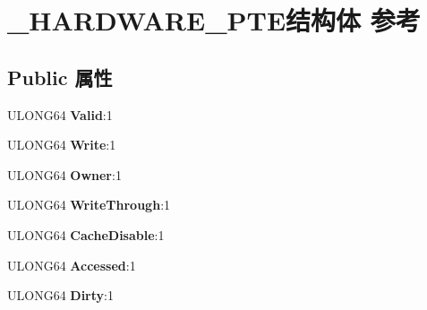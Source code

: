 \hypertarget{struct___h_a_r_d_w_a_r_e___p_t_e}{}\section{\+\_\+\+H\+A\+R\+D\+W\+A\+R\+E\+\_\+\+P\+T\+E结构体 参考}
\label{struct___h_a_r_d_w_a_r_e___p_t_e}
\subsection*{Public 属性}
\begin{DoxyCompactItemize}
\item 
\mbox{\label{struct___h_a_r_d_w_a_r_e___p_t_e_ac20c6a7cd10f8cf1a64e47c3b0e0a8c6}} 
U\+L\+O\+N\+G64 {\bfseries Valid}\+:1
\item 
\mbox{\label{struct___h_a_r_d_w_a_r_e___p_t_e_abcd4dfb1782a0000d64131d31c0d871b}} 
U\+L\+O\+N\+G64 {\bfseries Write}\+:1
\item 
\mbox{\label{struct___h_a_r_d_w_a_r_e___p_t_e_a618403a2e6a3dbc6bef655d8e27e0b15}} 
U\+L\+O\+N\+G64 {\bfseries Owner}\+:1
\item 
\mbox{\label{struct___h_a_r_d_w_a_r_e___p_t_e_a282c3dabdfb0d00bcc57bbcb039c7f96}} 
U\+L\+O\+N\+G64 {\bfseries Write\+Through}\+:1
\item 
\mbox{\label{struct___h_a_r_d_w_a_r_e___p_t_e_ad0fc26184eaf6c311bed262d04e8defc}} 
U\+L\+O\+N\+G64 {\bfseries Cache\+Disable}\+:1
\item 
\mbox{\label{struct___h_a_r_d_w_a_r_e___p_t_e_acc8b07eb3b2647fdf9bdfb14542a57a0}} 
U\+L\+O\+N\+G64 {\bfseries Accessed}\+:1
\item 
\mbox{\label{struct___h_a_r_d_w_a_r_e___p_t_e_a440bca43b264ce97879a170a14122660}} 
U\+L\+O\+N\+G64 {\bfseries Dirty}\+:1
\item 
\mbox{\label{struct___h_a_r_d_w_a_r_e___p_t_e_a22436caaae1d147075c9c3e20c4c633d}} 

\end{DoxyCompactItemize}

